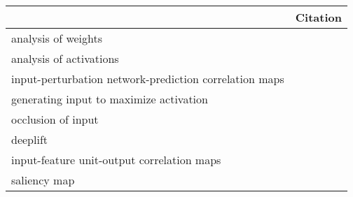 \begin{tabular}{ll}
\toprule
{} &                                                                                                                                                                                          Citation \\
\midrule
analysis of weights                                    &  \cite{Perez-Benitez2018, Yoon2018, Langkvist2018, Deiss2018, Lawhern2018, Xu2016, Tsinalis2016a, Nurse2016, Tabar2016a, Zheng2015, Stober2015, Manor2015, Yang2015a, Langkvist2012, Cecotti2011} \\
analysis of activations                                &                                                                                           \cite{Yuan2018a, Waytowich2018, Lawhern2018, kwak2017, Yin2017a, Supratak2017, Shamwell2016, Manor2015} \\
input-perturbation network-prediction correlation maps &                                                                                                              \cite{Schirrmeister2017a, Volker2018, Hartmann2018b, Behncke2017, Schirrmeister2017} \\
generating input to maximize activation                &                                                                                                                                      \cite{VanPutten2018b, Ruffini2018a, Sors2018, Bashivan2016a} \\
occlusion of input                                     &                                                                                                                                                        \cite{Lee2018, Chambon2018, Thodoroff2016} \\
deeplift                                               &                                                                                                                                                                                \cite{Lawhern2018} \\
input-feature unit-output correlation maps             &                                                                                                                                                                          \cite{Schirrmeister2017} \\
saliency map                                           &                                                                                                                                                                               \cite{Vilamala2017} \\

\end{tabular}
